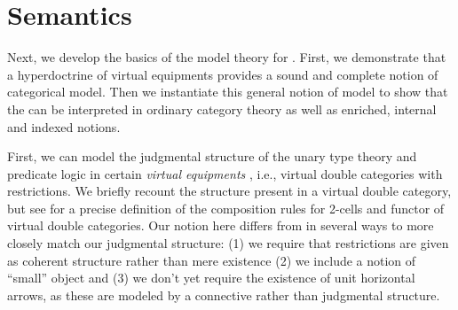 \documentclass{llncs}
\begin{document}
\section{Semantics}
\label{sec:semantics}

Next, we develop the basics of the model theory for \ohol{}.
%
First, we demonstrate that a hyperdoctrine of virtual equipments
provides a sound and complete notion of categorical model.
%
Then we instantiate this general notion of model to show that the
\ohol{} can be interpreted in ordinary category theory as well as
enriched, internal and indexed notions.


First, we can model the judgmental structure of the unary type theory
and predicate logic in certain \emph{virtual equipments}
\cite{leinster,crutwell-shulman}, i.e., virtual double categories with
restrictions. We briefly recount the structure present in a virtual
double category, but see \citet{crutwell-shulman} for a precise
definition of the composition rules for 2-cells and functor of virtual
double categories.
%
Our notion here differs from \citet{crutwell-shulman} in several ways
to more closely match our judgmental structure: (1) we require that
restrictions are given as coherent structure rather than mere
existence (2) we include a notion of ``small'' object and (3) we don't
yet require the existence of unit horizontal arrows, as these are
modeled by a connective rather than judgmental structure.
\end{document}
